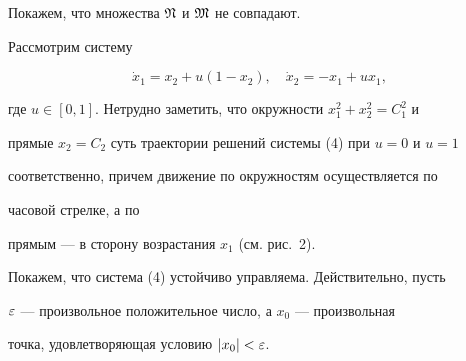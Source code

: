 Покажем, что множества $\frak N$ и $\frak M$ не совпадают.





\begin{exam}





Рассмотрим систему
















\begin{equation}


\Dot x_1=x_2+u(1-x_2),\quad


\Dot x_2=-x_1+ux_1,


\end{equation}


где $u\in[0,1]$. Нетрудно заметить, что окружности $x_1^2+x_2^2=C_1^2$ и


прямые $x_2=C_2$ суть траектории решений системы (4) при $u=0$ и $u=1$


соответственно, причем движение по окружностям осуществляется по


часовой стрелке, а по










прямым --- в сторону возрастания $x_1$ (см. рис.~2).





Покажем, что система (4) устойчиво управляема. Действительно, пусть


$\varepsilon$ --- произвольное положительное число, а $x_0$ --- произвольная


точка, удовлетворяющая условию $|x_0|<\varepsilon$.



\end{exam}
